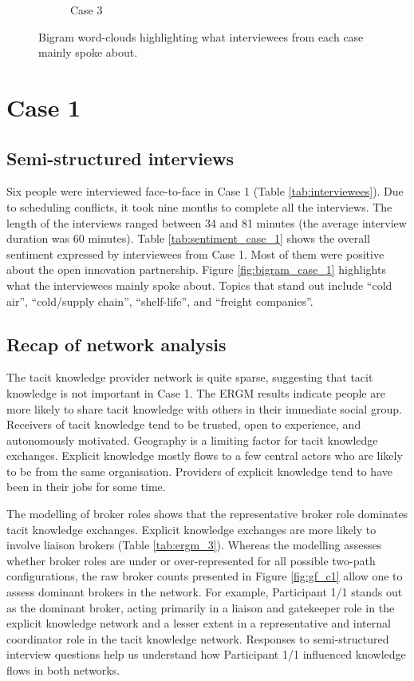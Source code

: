 \begin{figure}
\begin{subfigure}[b]{0.7\textwidth}
\caption{Case 3}
\label{fig:bigram_case_3}
\end{subfigure}
\caption[Bigram word-clouds from interviews]{Bigram word-clouds highlighting what interviewees from each case mainly spoke about.}
\label{fig:bigrams}
\end{figure}


\section{Case 1}

\subsection{Semi-structured interviews}

Six people were interviewed face-to-face in Case 1 (Table \ref{tab:interviewees}). Due to scheduling conflicts, it took nine months to complete all the interviews. The length of the interviews ranged between 34 and 81 minutes (the average interview duration was 60 minutes). Table \ref{tab:sentiment_case_1} shows the overall sentiment expressed by interviewees from Case 1. Most of them were positive about the open innovation partnership. Figure \ref{fig:bigram_case_1} highlights what the interviewees mainly spoke about. Topics that stand out include \enquote{cold air}, \enquote{cold/supply chain}, \enquote{shelf-life}, and \enquote{freight companies}.

\subsection{Recap of network analysis}

The tacit knowledge provider network is quite sparse, suggesting that tacit knowledge is not important in Case 1. The ERGM results indicate people are more likely to share tacit knowledge with others in their immediate social group. Receivers of tacit knowledge tend to be trusted, open to experience, and autonomously motivated. Geography is a limiting factor for tacit knowledge exchanges. Explicit knowledge mostly flows to a few central actors who are likely to be from the same organisation. Providers of explicit knowledge tend to have been in their jobs for some time. \medskip

The modelling of broker roles shows that the representative broker role dominates tacit knowledge exchanges. Explicit knowledge exchanges are more likely to involve liaison brokers (Table \ref{tab:ergm_3}). Whereas the modelling assesses whether broker roles are under or over-represented for all possible two-path configurations, the raw broker counts presented in Figure \ref{fig:gf_c1} allow one to assess dominant brokers in the network. For example, Participant 1/1 stands out as the dominant broker, acting primarily in a liaison and gatekeeper role in the explicit knowledge network and a lesser extent in a representative and internal coordinator role in the tacit knowledge network. Responses to semi-structured interview questions help us understand how Participant 1/1 influenced knowledge flows in both networks.  

